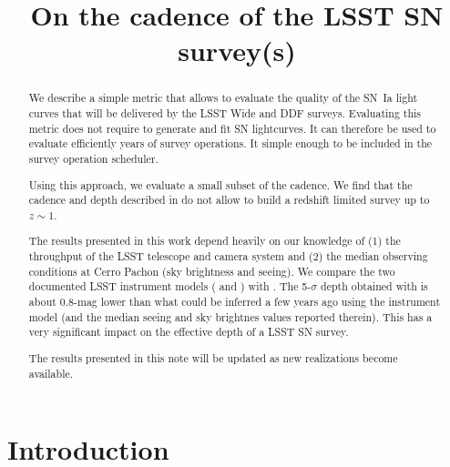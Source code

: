 \documentclass[\docopts]{\docclass}
\begin{document}
\title{ On the cadence of the LSST SN survey(s) }

\maketitlepre

\begin{abstract}

  
  We describe a simple metric that allows to evaluate the quality of
  the SN~Ia light curves that will be delivered by the LSST Wide and
  DDF surveys.  Evaluating this metric does not require to generate
  and fit SN lightcurves.  It can therefore be used to evaluate
  efficiently years of survey operations. It simple enough to be
  included in the survey operation scheduler.
  
  Using this approach, we evaluate a small subset of the 
   cadence. We find that the cadence and depth
  described in  do not allow to build a redshift
  limited survey up to $z \sim 1$.

  The results presented in this work depend heavily on our knowledge
  of (1) the throughput of the LSST telescope and camera system and
  (2) the median observing conditions at Cerro Pachon (sky brightness
  and seeing).  We compare the two documented LSST instrument models
  ( and ) with .  The
  5-$\sigma$ depth obtained with  is about 0.8-mag
  lower than what could be inferred a few years ago using the
   instrument model (and the median seeing and sky
  brightnes values reported therein).  This has a very significant
  impact on the effective depth of a LSST SN survey.
  
  The results presented in this note will be updated as new
   realizations become available.
\end{abstract}


\maketitlepost

% 

\section{Introduction}
\label{sec:intro}
\end{document}
